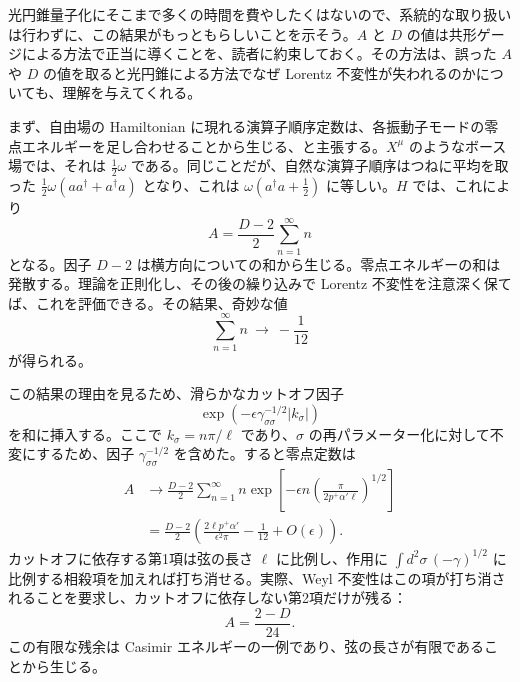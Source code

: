 光円錐量子化にそこまで多くの時間を費やしたくはないので、系統的な取り扱いは行わずに、この結果がもっともらしいことを示そう。$A$ と $D$ の値は共形ゲージによる方法で正当に導くことを、読者に約束しておく。その方法は、誤った $A$ や $D$ の値を取ると光円錐による方法でなぜ Lorentz 不変性が失われるのかについても、理解を与えてくれる。

まず、自由場の Hamiltonian に現れる演算子順序定数は、各振動子モードの零点エネルギーを足し合わせることから生じる、と主張する。$X^\mu$ のようなボース場では、それは $\frac12\omega$ である。同じことだが、自然な演算子順序はつねに平均を取った $\frac12\omega(aa^\dagger+a^\dagger a)$ となり、これは $\omega(a^\dagger a+\frac12)$ に等しい。$H$ では、これにより
\begin{equation}
A=\frac{D-2}{2}\sum_{n=1}^\infty n
\tag{1.3.31}\label{eq:1.3.31}
\end{equation}
となる。因子 $D-2$ は横方向についての和から生じる。零点エネルギーの和は発散する。理論を正則化し、その後の繰り込みで Lorentz 不変性を注意深く保てば、これを評価できる。その結果、奇妙な値
\begin{equation}
\sum_{n=1}^\infty n\ \longrightarrow\ -\frac1{12}
\tag{1.3.32}\label{eq:1.3.32}
\end{equation}
が得られる。

この結果の理由を見るため、滑らかなカットオフ因子
\begin{equation}
\exp\left(-\epsilon\gamma_{\sigma\sigma}^{-1/2}|k_\sigma|\right)
\tag{1.3.33}\label{eq:1.3.33}
\end{equation}
を和に挿入する。ここで $k_\sigma=n\pi/\ell$ であり、$\sigma$ の再パラメーター化に対して不変にするため、因子 $\gamma_{\sigma\sigma}^{-1/2}$ を含めた。すると零点定数は
\begin{equation}
\begin{aligned}
A&\longrightarrow
\frac{D-2}{2}\sum_{n=1}^\infty n
\exp\left[-\epsilon n\left(\frac{\pi}{2p^+\alpha'\ell}\right)^{1/2}\right]\\
&=\frac{D-2}{2}\left(\frac{2\ell p^+\alpha'}{\epsilon^2\pi}
-\frac1{12}+O(\epsilon)\right).
\end{aligned}
\tag{1.3.34}\label{eq:1.3.34}
\end{equation}
カットオフに依存する第1項は弦の長さ $\ell$ に比例し、作用に $\int d^2\sigma\,(-\gamma)^{1/2}$ に比例する相殺項を加えれば打ち消せる。実際、Weyl 不変性はこの項が打ち消されることを要求し、カットオフに依存しない第2項だけが残る：
\begin{equation}
A=\frac{2-D}{24}.
\tag{1.3.35}\label{eq:1.3.35}
\end{equation}
この有限な残余は Casimir エネルギーの一例であり、弦の長さが有限であることから生じる。

